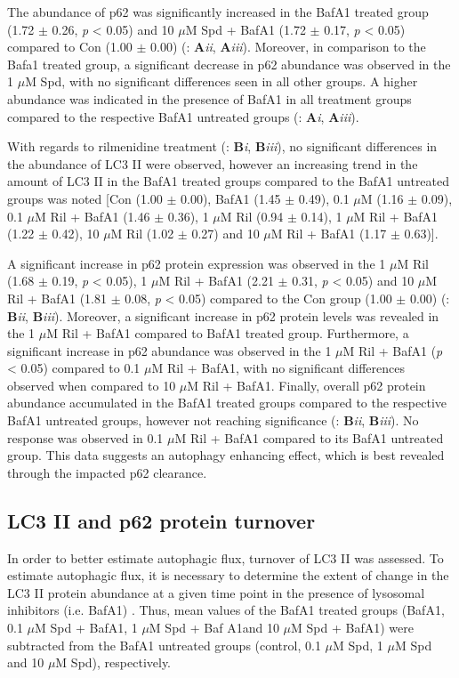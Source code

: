 {The abundance of p62 was significantly increased in the BafA1 treated group (1.72 $\pm$ 0.26, \textit{p} < 0.05) and  10 $\mu$M Spd + BafA1 (1.72 $\pm$ 0.17, \textit{p} < 0.05) compared to Con (1.00 $\pm$ 0.00) (: \textbf{A}\textit{ii}, \textbf{A}\textit{iii}). Moreover, in comparison to the Bafa1 treated group, a significant decrease in p62 abundance was observed in the 1 $\mu$M Spd, with no significant differences seen in all other groups. A higher abundance was indicated in the presence of BafA1 in all treatment groups compared to the respective BafA1 untreated groups (: \textbf{A}\textit{i}, \textbf{A}\textit{iii}).

With regards to rilmenidine treatment (: \textbf{B}\textit{i}, \textbf{B}\textit{iii}), no significant differences in the abundance of LC3 II were observed, however an increasing trend in the amount of LC3 II in the BafA1 treated groups compared to the BafA1 untreated groups was noted [Con (1.00 $\pm$ 0.00), BafA1 (1.45 $\pm$ 0.49), 0.1 $\mu$M (1.16 $\pm$ 0.09), 0.1 $\mu$M Ril + BafA1 (1.46 $\pm$ 0.36), 1 $\mu$M Ril (0.94 $\pm$ 0.14), 1 $\mu$M Ril + BafA1 (1.22 $\pm$ 0.42), 10 $\mu$M Ril (1.02 $\pm$ 0.27) and 10 $\mu$M Ril + BafA1 (1.17 $\pm$ 0.63)].

A significant increase in p62 protein expression was observed in the 1 $\mu$M Ril (1.68 $\pm$ 0.19, \textit{p} < 0.05), 1 $\mu$M Ril + BafA1 (2.21 $\pm$ 0.31, \textit{p} < 0.05) and 10 $\mu$M Ril + BafA1 (1.81 $\pm$ 0.08, \textit{p} < 0.05) compared to the Con group (1.00 $\pm$ 0.00) (: \textbf{B}\textit{ii}, \textbf{B}\textit{iii}). Moreover, a significant increase in p62 protein levels was revealed in the 1 $\mu$M Ril + BafA1 compared to BafA1 treated group. Furthermore, a significant increase in p62 abundance was observed in the 1 $\mu$M Ril + BafA1 (\textit{p} < 0.05) compared to 0.1 $\mu$M Ril + BafA1, with no significant differences observed when compared to 10 $\mu$M Ril + BafA1. Finally, overall p62 protein abundance accumulated in the BafA1 treated groups compared to the respective BafA1 untreated groups, however not reaching significance (: \textbf{B}\textit{ii}, \textbf{B}\textit{iii}). No response was observed in 0.1 $\mu$M Ril + BafA1 compared to its BafA1 untreated group. This data suggests an autophagy enhancing effect, which is best revealed through the impacted p62 clearance.

\subsection{LC3 II and p62 protein turnover}
In order to better estimate autophagic flux, turnover of LC3 II was assessed. To estimate autophagic flux, it is necessary to determine the extent of change in the LC3 II protein abundance at a given time point in the presence of lysosomal inhibitors (i.e. BafA1) \citep{Martinez-Lopez2013}. Thus, mean values of the BafA1 treated groups (BafA1, 0.1 $\mu$M Spd + BafA1, 1 $\mu$M Spd + Baf A1and 10 $\mu$M Spd + BafA1) were subtracted from the BafA1 untreated groups (control, 0.1 $\mu$M Spd, 1 $\mu$M Spd and 10 $\mu$M Spd), respectively.

}
